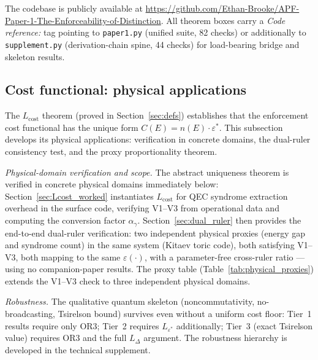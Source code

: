 \documentclass[11pt]{article}
\theoremstyle{remark}
\begin{document}
\smallskip\noindent The codebase is publicly available at
\url{https://github.com/Ethan-Brooke/APF-Paper-1-The-Enforceability-of-Distinction}.
All theorem boxes carry a \textit{Code reference:} tag pointing to
\texttt{paper1.py} (unified suite, 82 checks) or additionally to
\texttt{supplement.py} (derivation-chain spine, 44 checks) for load-bearing
bridge and skeleton results.

\subsection{Cost functional: physical applications}
\label{sec:cost_consequences}

\noindent The $L_{\mathrm{cost}}$ theorem (proved in Section~\ref{sec:defs}) establishes that the enforcement cost functional has the unique form $C(E) = n(E) \cdot \varepsilon^*$.  This subsection develops its physical applications: verification in concrete domains, the dual-ruler consistency test, and the proxy proportionality theorem.

\smallskip\noindent\textit{Physical-domain verification and scope.}  The abstract uniqueness theorem is verified in concrete physical domains immediately below: Section~\ref{sec:Lcost_worked} instantiates $L_{\mathrm{cost}}$ for QEC syndrome extraction overhead in the surface code, verifying V1--V3 from operational data and computing the conversion factor $\alpha_\gamma$.  Section~\ref{sec:dual_ruler} then provides the end-to-end dual-ruler verification: two independent physical proxies (energy gap and syndrome count) in the same system (Kitaev toric code), both satisfying V1--V3, both mapping to the same $\varepsilon(\cdot)$, with a parameter-free cross-ruler ratio --- using no companion-paper results.  The proxy table (Table~\ref{tab:physical_proxies}) extends the V1--V3 check to three independent physical domains.

\smallskip\noindent\textit{Robustness.}  The qualitative quantum skeleton (noncommutativity, no-broadcasting, Tsirelson bound) survives even without a uniform cost floor: Tier~1 results require only OR3; Tier~2 requires $L_{\varepsilon^*}$ additionally; Tier~3 (exact Tsirelson value) requires OR3 and the full $L_\Delta$ argument.  The robustness hierarchy is developed in the technical supplement.
\end{document}
